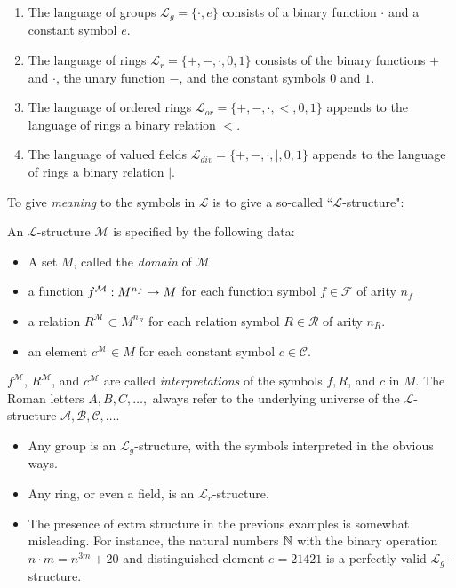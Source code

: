 \begin{example}
	\begin{enumerate}
		\item The language of groups $\mathcal{L}_g=\{\cdot, e\}$ consists of a binary function $\cdot$ and a constant symbol $e$.
		\item The language of rings $\mathcal{L}_r=\{+,-,\cdot, 0,1\}$ consists of the binary functions $+$ and $\cdot$, the unary function $-$, and the constant symbols $0$ and $1$. 
		\item The language of ordered rings $\mathcal{L}_{or} = \{+,-,\cdot,<,0,1\}$ appends to the language of rings a binary relation $<$.
		\item The language of valued fields $\mathcal{L}_{div}=\{+,-,\cdot,\mid, 0,1\}$ appends to the language of rings a binary relation $\mid$.
	\end{enumerate}
\end{example}

To give \emph{meaning} to the symbols in $\mathcal{L}$ is to give a so-called ``$\mathcal{L}$-structure":

\begin{definition}
An $\mathcal{L}$-structure $\mathcal{M}$ is specified by the following data:
\begin{itemize}
	\item A set $M$, called the \emph{domain} of $\mathcal{M}$
	\item a function $f^{\mathcal{M}}:M^{n_f}\rightarrow M$ for each function symbol $f\in\mathcal{F}$ of arity $n_f$
	\item a relation $R^{\mathcal{M}}\subset M^{n_R}$ for each relation symbol $R\in\mathcal{R}$ of arity $n_R$.
	\item an element $c^{\mathcal{M}}\in M$ for each constant symbol $c\in\mathcal{C}$.
\end{itemize}
$f^{\mathcal{M}}$, $R^{\mathcal{M}}$, and $c^{\mathcal{M}}$ are called \emph{interpretations} of the symbols $f, R$, and $c$ in $M$. The Roman letters $A,B,C,\dots,$ always refer to the underlying universe of the $\mathcal{L}$-structure $\mathcal{A},\mathcal{B},\mathcal{C},\dots$.
\end{definition}

\begin{example}
	\begin{itemize}
		\item Any group is an $\mathcal{L}_g$-structure, with the symbols interpreted in the obvious ways.
		\item Any ring, or even a field, is an $\mathcal{L}_r$-structure.
		\item The presence of extra structure in the previous examples is somewhat misleading. For instance, the natural numbers $\mathbb{N}$ with the binary operation $n\cdot m = n^{3m}+20$ and distinguished element $e=21421$ is a perfectly valid $\mathcal{L}_g$-structure.
	\end{itemize}
\end{example}

